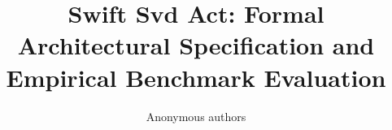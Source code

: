 \title{\textbf{Swift Svd Act: Formal Architectural Specification and Empirical Benchmark Evaluation}}

\author{Anonymous authors}
